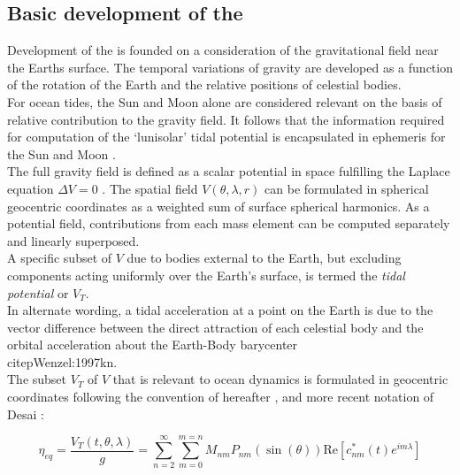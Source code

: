 \subsection{Basic development of the \ATGP{}}  \label{S:basic_potential}

Development of the \ATGP{} is founded on a consideration of the gravitational field near the Earths surface. The temporal variations of gravity are developed as a function of the rotation of the Earth and the relative positions of celestial bodies.\\
For ocean tides, the Sun and Moon alone are considered relevant on the basis of relative contribution to the gravity field. It follows that the information required for computation of the `lunisolar' tidal potential is encapsulated in ephemeris for the Sun and Moon \citep{Agnew:2011ub}.\\



The full gravity field is defined as a scalar potential in space fulfilling the Laplace equation $\Delta V=0$ \citep[sec 5.3.1]{Urban:2013vl}.  The spatial field $V(\theta,\lambda,r)$ can be formulated in spherical geocentric coordinates as a weighted sum of surface spherical harmonics. As a potential field, contributions from each mass element can be computed separately and linearly superposed.\\
A specific subset of $V$ due to bodies external to the Earth, but excluding components acting uniformly over the Earth's surface, is termed the \emph{tidal potential} \ATGP{} or $V_T$.\\
In alternate wording, a tidal acceleration at a point on the Earth is due to the vector difference between the direct attraction of each celestial body and the orbital acceleration about the Earth-Body barycenter\\citep{Wenzel:1997kn}.\\

The subset $V_T$ of $V$ that is relevant to ocean dynamics is formulated in geocentric coordinates following the convention of \cite{Cartwright:1973em} hereafter \CTE{}, and more recent notation of Desai \cite{Desai:2006wo}:

\begin{equation}
\label{E:VT}
\eta_{eq} = \frac{V_T(t,\theta,\lambda) }{g} = \sum_{n=2}^{\infty} \sum_{m=0}^{m=n} M_{nm} P_{nm}( \sin(\theta) ) \text{Re} \left [ c^{*}_{nm}(t) e^{im\lambda} \right ]
\end{equation}

